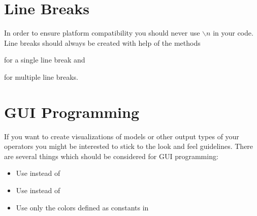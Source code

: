 \section{Line Breaks}

In order to ensure platform compatibility you should never use $\backslash n$ in 
your code. Line breaks should always be created with help of the methods 
\begin{center}
\end{center}
for a single line break and
\begin{center}
\end{center}
for multiple line breaks.



\section{GUI Programming}

If you want to create visualizations of models or other output types
of your operators you might be interested to stick to the \rapidminer
look and feel guidelines. There are several things which should be considered 
for GUI programming:
\begin{itemize}
\item Use  instead of 
\item Use  instead of 
\item Use only the colors defined as constants in 
\end{itemize}

